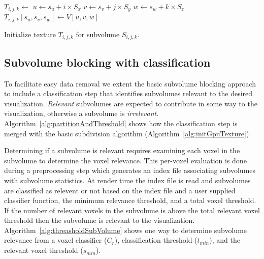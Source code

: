\documentclass[journal]{vgtc}                %
\begin{document}
\begin{algorithm}[]  
	\begin{algorithmic}[1]
		\State $T_{i,j,k} \gets $  
		 
		\State $u \gets s_u + i \times S_x$ 
		\State $v \gets s_v + j \times S_y$ 
		\State $w \gets s_w + k \times S_z$ 
		\State $T_{i,j,k}\left[s_u, s_v, s_w \right] \gets V\left[u,v,w\right]$ 
		\EndFor
		\EndFor
		\EndFor
		\EndProcedure
	\end{algorithmic}
	\caption{Initialize texture $T_{i,j,k}$ for subvolume $S_{i,j,k}$.}
	\label{alg:initGpuTexture}
\end{algorithm}


\subsection{Subvolume blocking with classification}\label{sec:subvolumeBlockingWithClassification}

To facilitate easy data removal we extent the basic subvolume blocking approach
to include a classification step that identifies subvolumes relevant
to the desired visualization.  \textit{Relevant} subvolumes are expected to
contribute in some way to the visualization, otherwise a subvolume is
\textit{irrelevant}. Algorithm~\ref{alg:partitionAndThreshold} shows how the
classification step is merged  with the basic subdivision algorithm
(Algorithm~\ref{alg:initGpuTexture}).

Determining if a subvolume is relevant requires examining each voxel in the
subvolume to determine the voxel relevance. This per-voxel evaluation is done 
during a preprocessing step which generates an index file associating subvolumes
with subvolume statistics. At render time the index file is read and subvolumes are
classified as relevent or not based on the index file and a user supplied classifier
function, the minimum relevance threshold, and a total voxel
threshold. If the number of relevant voxels in the subvolume is above the total
relevant voxel threshold then the subvolume is relevant to the visualization.
Algorithm~\ref{alg:threasholdSubVolume} shows one way to determine subvolume
relevance from a voxel classifier ($C_{r}$), classification threshold ($t_{min}$),
and the relevant voxel threshold ($s_{min}$).
\end{document}
